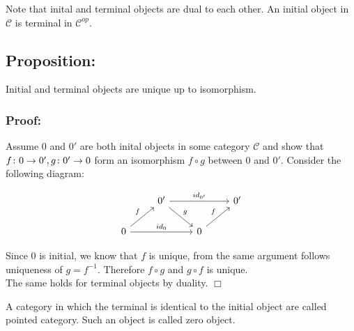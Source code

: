 Note that inital and terminal objects are dual to each other.
An initial object in $\mathscr{C}$ is terminal in $\mathscr{C}^{op}$.
\subsection {Proposition:}
Initial and terminal objects are unique up to isomorphism.

\subsubsection {Proof:}
Assume $0$ and $0'$ are both inital objects in some category $\mathscr{C}$ and show that
$f \from 0 \to 0', g \from 0' \to 0$ form an isomorphism
$f \circ g$ between $0$ and $0'$. Consider the following diagram:

\[
\begin{tikzcd}
  & 0' \arrow{dr}{g} \arrow{rr}{id_{0'}}    &&  0'\\
  0 \arrow{ur}{f} \arrow{rr}{id_0} && 0 \arrow{ur}{f}
\end{tikzcd}
\]

Since $0$ is initial, we know that $f$ is unique, from the same argument follows uniqueness of $g = f^{-1}$.
Therefore $f \circ g$ and $g \circ f$ is unique.\\
The same holds for terminal objects by duality. $\Box$

A category in which the terminal is identical to the initial object are called pointed category.
Such an object is called zero object.


